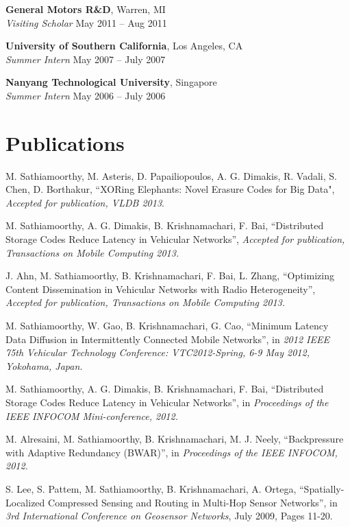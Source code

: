\documentclass[margin,line]{resume}
\begin{document}
\begin{resume}
    \textbf{General Motors R\&D}, Warren, MI\\
    \textsl{Visiting Scholar} \hfill May 2011 -- Aug 2011

    \textbf{University of Southern California}, Los Angeles, CA\\%
    \textsl{Summer Intern} \hfill May 2007 -- July 2007

    \textbf{Nanyang Technological University}, Singapore \\%
    \textsl{Summer Intern} \hfill May 2006 -- July 2006

\section{\mysidestyle Publications}
\begin{list2}  
   \item M. Sathiamoorthy, M. Asteris, D. Papailiopoulos, A. G. Dimakis, R. Vadali, S. Chen, D. Borthakur,
      ``XORing Elephants: Novel Erasure Codes for Big Data", \textsl{Accepted for publication, VLDB 2013}.
     \item M. Sathiamoorthy, A. G. Dimakis, B. Krishnamachari, F. Bai, 
     ``Distributed Storage Codes Reduce Latency in Vehicular Networks'', \textsl{Accepted for publication, Transactions on Mobile Computing 2013.}
     \item J. Ahn, M. Sathiamoorthy, B. Krishnamachari, F. Bai, L. Zhang, ``Optimizing Content Dissemination in Vehicular Networks with Radio Heterogeneity'', \textsl{Accepted for publication, Transactions on Mobile Computing 2013.}
      \item M. Sathiamoorthy, W. Gao, B. Krishnamachari, G. Cao,
    ``Minimum Latency Data Diffusion in Intermittently Connected Mobile Networks'', in
    \textsl{2012 IEEE 75th Vehicular Technology Conference: VTC2012-Spring, 6-9 May 2012, Yokohama, Japan.}
    \item M. Sathiamoorthy, A. G. Dimakis, B. Krishnamachari, F. Bai, 
    ``Distributed Storage Codes Reduce Latency in Vehicular Networks'', in
    \textsl{Proceedings of the IEEE INFOCOM Mini-conference, 2012.}
\newpage
    \item M. Alresaini, M. Sathiamoorthy, B. Krishnamachari, M. J. Neely, ``Backpressure with Adaptive Redundancy (BWAR)'', 
    in \textsl{Proceedings of the IEEE INFOCOM, 2012.}
    \item S. Lee, S. Pattem, M. Sathiamoorthy, B. Krishnamachari, A. Ortega, ``Spatially-Localized Compressed Sensing and Routing in Multi-Hop Sensor Networks'', in \textsl{3rd International Conference on Geosensor Networks}, July 2009, Pages 11-20.  
    \end{list2}



\end{resume}
\end{document}
